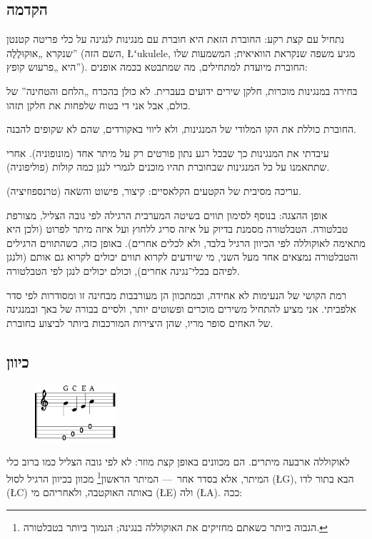 \subsection*{הקדמה}

נתחיל עם קצת רקע: החוברת הזאת היא חוברת עם מנגינות לנגינה על כלי פריטה קטנטן שנקרא „אוּקוּלֶלֶה” (השם הזה, \L{{ʻ}ukulele}, מגיע משפה שנקראת הוואיאית; המשמעות שלו היא „פרעוש קופץ”). החוברת מיועדת למתחילים, מה שמתבטא בכמה אופנים:
\begin{compactitem}
	\item בחירה במנגינות מוכרות, חלקן שירים ידועים בעברית. לא כולן בהכרח „הלחם והטחינה” של כולם, אבל אני די בטוח שלפחות את חלקן תזהו.
	\item החוברת כוללת את הקו המלודי של המנגינות, ולא ליווי באקורדים, שהם לא שקופים להבנה.
	\item עיבדתי את המנגינות כך שבכל רגע נתון פורטים רק על מיתר אחד (מונופוניה). אחרי שתתאמנו על כל המנגינות שבחוברת תהיו מוכנים לגמרי לנגן כמה קולות (פוליפוניה).
	\item עריכה מסיבית של הקטעים הקלאסיים: קיצור, פישוט והשׂאה (טרנספוזיציה).
	\item אופן ההצגה: בנוסף לסימון תווים בשיטה המערבית הרגילה לפי גובה הצליל, מצורפת טבלטורה. הטבלטורה מסמנת בדיוק על איזה סריג ללחוץ ועל איזה מיתר לפרוט (ולכן היא מתאימה לאוקוללה לפי הכיוון הרגיל בלבד, ולא לכלים אחרים). באופן כזה, כשהתווים הרגילים והטבלטורה נמצאים אחד מעל השני, מי שיודעים לקרוא תווים יכולים לקרוא גם אותם (ולנגן לפיהם בכלי־נגינה אחרים), וכולם יכולים לנגן לפי הטבלטורה.
\end{compactitem}
רמת הקושי של הנעימות לא אחידה, ובמתכוון הן מעורבבות מבחינה זו ומסודרות לפי סדר אלפביתי. אני מציע להתחיל משירים מוכרים ופשוטים יותר, ולסיים בבורה של באך ובמנגינה של האחים סופר מריו, שהן היצירות המורכבות ביותר לביצוע בחוברת.



\subsection*{כיוון}

\begin{figure}\vspace{-\baselineskip}\includegraphics[width=3cm]{agordo.eps}\end{figure}
לאוקוללה ארבעה מיתרים. הם מכוונים באופן קצת מוזר: לא לפי גובה הצליל כמו ברוב כלי המיתר, אלא בסדר אחר~— המיתר הראשון\footnote{הגבוה ביותר כשאתם מחזיקים את האוקוללה בנגינה; הנמוך ביותר בטבלטורה.} מכוון בכיוון הרגיל לסול (\L{G}), הבא בתור לדו (\L{C}) באותה האוקטבה, ולאחריהם מי (\L{E}) ולה (\L{A}). ככה:

